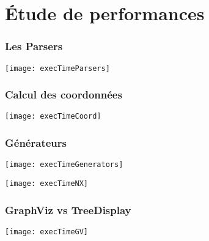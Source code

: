 \section{Étude de performances}

\begin{frame}[plain]
	\frametitle{Les Parsers}
	\begin{center}
	\texttt{[image: execTimeParsers]}
	\end{center}
\end{frame}

\begin{frame}
	\frametitle{Calcul des coordonnées}
	\begin{center}
	\texttt{[image: execTimeCoord]}
	\end{center}
\end{frame}

\begin{frame}[allowframebreaks]
	\frametitle{Générateurs}
	\begin{center}
	\texttt{[image: execTimeGenerators]}
	\end{center}
	\begin{center}
	\texttt{[image: execTimeNX]}
	\end{center}
\end{frame}

\begin{frame}
	\frametitle{GraphViz vs TreeDisplay}
	\begin{center}
	\texttt{[image: execTimeGV]}
	\end{center}
\end{frame}



